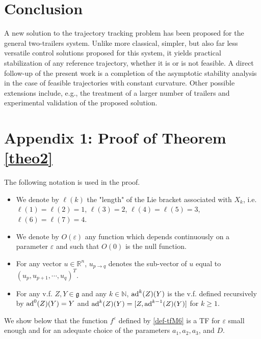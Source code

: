 \documentclass[a4paper,twoside]{article}
\def \g {{\mathfrak g}}
\def \ad {\textnormal{ad}}
\def \RR {{\mathbb R}}
\def \NN {{\mathbb N}}
\def \eps {\varepsilon}
\begin{document}
\section{Conclusion}
\label{sec-conclu}

A new solution to the trajectory tracking problem  has been proposed for the general two-trailers system. 
Unlike more classical, simpler, but also far less versatile control solutions proposed for this system, it yields practical stabilization of any reference trajectory, whether it is or is not feasible.
A direct follow-up of the present work is a completion of the asymptotic stability
analysis in the case of feasible trajectories with constant curvature. Other possible extensions include, e.g., 
the treatment of a larger number of trailers and experimental validation of the proposed solution.


 


\section*{Appendix 1: Proof of Theorem \ref{theo2}}
The following notation is used in the proof. 
\begin{itemize}
\item We denote by $\ell(k)$ the "length"  of the Lie bracket associated 
with $X_k$, i.e. $\ell(1)=\ell(2)=1$, $\ell(3)=2$, $\ell(4)= \ell(5)=3$, $\ell(6)=\ell(7)= 4$.
\item We denote by $O(\eps)$ any function which depends continuously on a parameter $\eps$ and such that $O(0)$ is the null function.
\item For any vector $u \in \RR^n$,  $u_{p \rightarrow q}$ denotes the sub-vector of $u$ equal to 
$(u_p, u_{p+1}, \cdots, u_q)^T$.
\item For any v.f. $Z,Y \in \g$ and any $k \in \NN$, $\ad^k(Z) (Y)$ is the v.f. defined recursively by
$\ad^0(Z)(Y)= Y$ and $\ad^k(Z)(Y)= [Z,\ad^{k-1}(Z)(Y)]$ for $k \geq 1$.
\end{itemize}

\noindent We show below that the function $f^\eps$ defined by \eqref{def-tfM6} is a TF for $\eps$ small
enough and for an adequate choice of the parameters $a_1,a_2,a_3$, and $D$.
\end{document}

